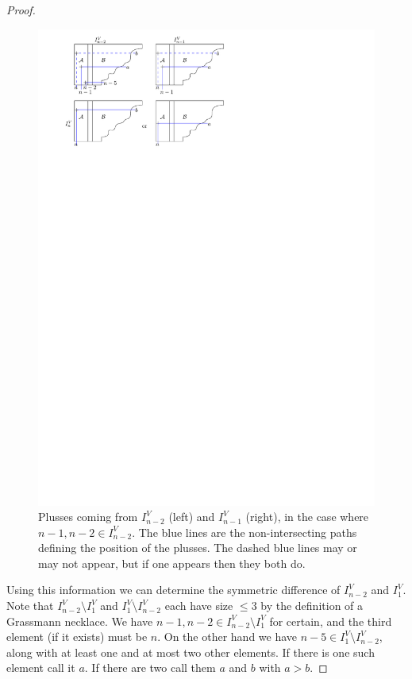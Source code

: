 \documentclass[11pt]{article}
\theoremstyle{remark}
\theoremstyle{definition}
\begin{document}
\begin{proof}
  \begin{figure}
    \includegraphics{messy}
    \caption{Plusses coming from $I_{n-2}^{V}$ (left) and  $I_{n-1}^{V}$ (right), in the case where $n-1, n-2\in I_{n-2}^{V}$.  The blue lines are the non-intersecting paths defining the position of the plusses.  The dashed blue lines may or may not appear, but if one appears then they both do.}\label{fig messy}
  \end{figure}
  
  Using this information we can determine the symmetric difference of $I_{n-2}^{V}$ and $I_1^{V}$.  Note that $I_{n-2}^V\setminus I_1^V$ and $I_1^V\setminus I_{n-2}^V$ each have size $\leq 3$ by the definition of a Grassmann necklace. We have $n-1, n-2 \in I_{n-2}^{V} \setminus I_1^V$ for certain, and the third element (if it exists) must be $n$. On the other hand we have $n-5 \in I_1^{V} \setminus I_{n-2}^V$, along with at least one and at most two other elements.  If there is one such element call it $a$.  If there are two call them $a$ and $b$ with $a>b$.  


\end{proof}
\end{document}
